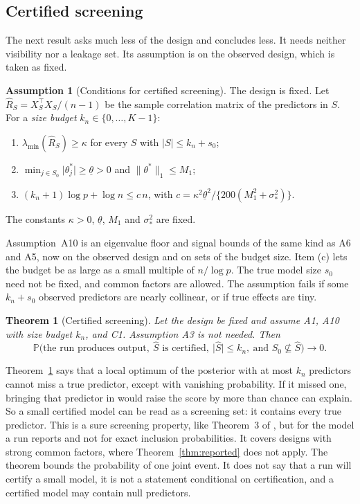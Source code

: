\documentclass[11pt]{article}
\renewcommand{\P}{\mathbb{P}}
\newcommand{\abs}[1]{\lvert #1\rvert}
\newcommand{\norm}[1]{\lVert #1\rVert}
\newcommand{\lmin}{\lambda_{\min}}
\newcommand{\tstar}{\theta^*}
\newcommand{\sigs}{\sigma_*}
\newcommand{\Sz}{S_0}
\newcommand{\sz}{s_0}
\newcommand{\Shat}{\hat S}
\theoremstyle{plain}
\newtheorem{thm}{Theorem}
\theoremstyle{definition}
\newtheorem{asm}{Assumption}
\begin{document}
\subsection{Certified screening}\label{sec:screening}

The next result asks much less of the design and concludes less. It needs neither visibility nor a leakage set. Its
assumption is on the observed design, which is taken as fixed.

\begin{asm}[Conditions for certified screening]\label{a:scr}
The design is fixed. Let $\hat R_S=X_S^\top X_S/(n-1)$ be the sample correlation matrix of the predictors in $S$. For a
\emph{size budget} $k_n\in\{0,\dots,K-1\}$:
\begin{enumerate}[label=(\alph*)]
  \item $\lmin(\hat R_S)\ge\kappa$ for every $S$ with $\abs{S}\le k_n+\sz$;
  \item $\min_{j\in\Sz}\abs{\theta^*_j}\ge\underline\theta>0$ and $\norm{\tstar}_1\le M_1$;
  \item $(k_n+1)\log p+\log n\le c\,n$, with $c=\kappa^2\underline\theta^2/\{200(M_1^2+\sigs^2)\}$.
\end{enumerate}
The constants $\kappa>0$, $\underline\theta$, $M_1$ and $\sigs^2$ are fixed.
\end{asm}

Assumption~A10 is an eigenvalue floor and signal bounds of the same kind as A6 and A5, now on the observed design and
on sets of the budget size. Item (c) lets the budget be as large as a small multiple of $n/\log p$. The true model size
$\sz$ need not be fixed, and common factors are allowed. The assumption fails if some $k_n+\sz$ observed predictors are
nearly collinear, or if true effects are tiny.

\begin{thm}[Certified screening]\label{thm:screen}
Let the design be fixed and assume A1, A10 with size budget $k_n$, and C1. Assumption A3 is not needed. Then
\[
  \P\big(\text{the run produces output},\ \Shat\text{ is certified},\ \abs{\Shat}\le k_n,\ \text{and }\Sz\not\subseteq\Shat\big)\to0 .
\]
\end{thm}

Theorem~\ref{thm:screen} says that a local optimum of the posterior with at most $k_n$ predictors cannot miss a true
predictor, except with vanishing probability. If it missed one, bringing that predictor in would raise the score by
more than chance can explain. So a small certified model can be read as a screening set: it contains every true
predictor. This is a sure screening property, like Theorem~3 of \citet{SongLiang2015}, but for the model a run reports
and not for exact inclusion probabilities. It covers designs with strong common factors, where
Theorem~\ref{thm:reported} does not apply. The theorem bounds the probability of one joint event. It does not say that a
run will certify a small model, it is not a statement conditional on certification, and a certified model may contain
null predictors.
\end{document}
